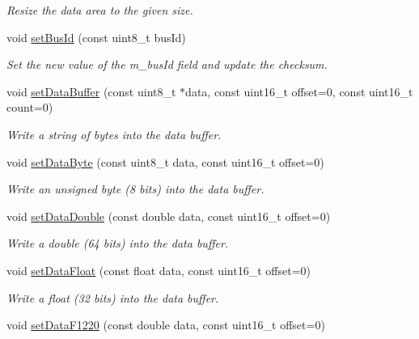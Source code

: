 \begin{DoxyCompactItemize}
\begin{DoxyCompactList}\small\item\em \-Resize the data area to the given size. \end{DoxyCompactList}\item 
\hypertarget{classxsens_1_1Message_a8f8333967341f688dd885bf72d250671}{void \hyperlink{classxsens_1_1Message_a8f8333967341f688dd885bf72d250671}{set\-Bus\-Id} (const uint8\-\_\-t bus\-Id)}\label{classxsens_1_1Message_a8f8333967341f688dd885bf72d250671}

\begin{DoxyCompactList}\small\item\em \-Set the new value of the m\-\_\-bus\-Id field and update the checksum. \end{DoxyCompactList}\item 
void \hyperlink{classxsens_1_1Message_a7927e802bf98e6687c8750aa60ec559f}{set\-Data\-Buffer} (const uint8\-\_\-t $\ast$data, const uint16\-\_\-t offset=0, const uint16\-\_\-t count=0)
\begin{DoxyCompactList}\small\item\em \-Write a string of bytes into the data buffer. \end{DoxyCompactList}\item 
void \hyperlink{classxsens_1_1Message_a79da3ff22e98da0e6f55d0dadbf345c4}{set\-Data\-Byte} (const uint8\-\_\-t data, const uint16\-\_\-t offset=0)
\begin{DoxyCompactList}\small\item\em \-Write an unsigned byte (8 bits) into the data buffer. \end{DoxyCompactList}\item 
void \hyperlink{classxsens_1_1Message_abd5dfb7917ffb4f9302a8389a7a111a9}{set\-Data\-Double} (const double data, const uint16\-\_\-t offset=0)
\begin{DoxyCompactList}\small\item\em \-Write a double (64 bits) into the data buffer. \end{DoxyCompactList}\item 
void \hyperlink{classxsens_1_1Message_a51c25a1a481fa96973607df9af109031}{set\-Data\-Float} (const float data, const uint16\-\_\-t offset=0)
\begin{DoxyCompactList}\small\item\em \-Write a float (32 bits) into the data buffer. \end{DoxyCompactList}\item 
void \hyperlink{classxsens_1_1Message_a9a8ece4e59f7f4247751939690edb74b}{set\-Data\-F1220} (const double data, const uint16\-\_\-t offset=0)

\end{DoxyCompactItemize}
